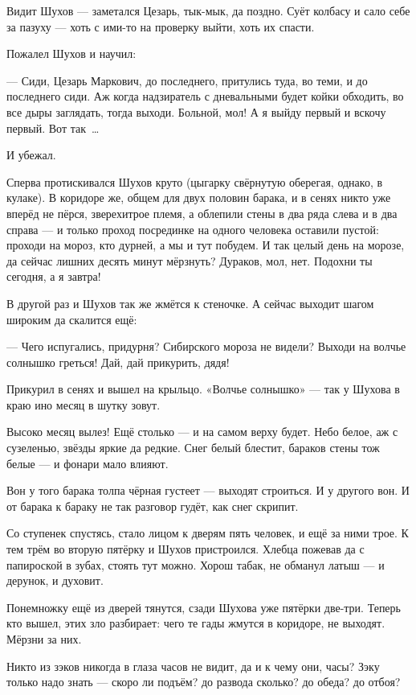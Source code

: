Видит Шухов --- заметался Цезарь, тык-мык, да поздно. Суёт колбасу и сало себе за пазуху --- хоть с ими-то на проверку выйти, хоть их спасти.

Пожалел Шухов и научил:

--- Сиди, Цезарь Маркович, до последнего, притулись туда, во теми, и до последнего сиди. Аж когда надзиратель с дневальными будет койки обходить, во все дыры заглядать, тогда выходи. Больной, мол! А я выйду первый и вскочу первый. Вот так~\dots{}

И убежал.

Сперва протискивался Шухов круто (цыгарку свёрнутую оберегая, однако, в кулаке). В коридоре же, общем для двух половин барака, и в сенях никто уже вперёд не пёрся, зверехитрое племя, а облепили стены в два ряда слева и в два справа --- и только проход посрединке на одного человека оставили пустой: проходи на мороз, кто дурней, а мы и тут побудем. И так целый день на морозе, да сейчас лишних десять минут мёрзнуть? Дураков, мол, нет. Подохни ты сегодня, а я завтра!

В другой раз и Шухов так же жмётся к стеночке. А сейчас выходит шагом широким да скалится ещё:

--- Чего испугались, придурня? Сибирского мороза не видели? Выходи на волчье солнышко греться! Дай, дай прикурить, дядя!

Прикурил в сенях и вышел на крыльцо. «Волчье солнышко» --- так у Шухова в краю ино месяц в шутку зовут.

Высоко месяц вылез! Ещё столько --- и на самом верху будет. Небо белое, аж с сузеленью, звёзды яркие да редкие. Снег белый блестит, бараков стены тож белые --- и фонари мало влияют.

Вон у того барака толпа чёрная густеет --- выходят строиться. И у другого вон. И от барака к бараку не так разговор гудёт, как снег скрипит.

Со ступенек спустясь, стало лицом к дверям пять человек, и ещё за ними трое. К тем трём во вторую пятёрку и Шухов пристроился. Хлебца пожевав да с папироской в зубах, стоять тут можно. Хорош табак, не обманул латыш --- и дерунок, и духовит.

Понемножку ещё из дверей тянутся, сзади Шухова уже пятёрки две-три. Теперь кто вышел, этих зло разбирает: чего те гады жмутся в коридоре, не выходят. Мёрзни за них.

Никто из зэков никогда в глаза часов не видит, да и к чему они, часы? Зэку только надо знать --- скоро ли подъём? до развода сколько? до обеда? до отбоя?

